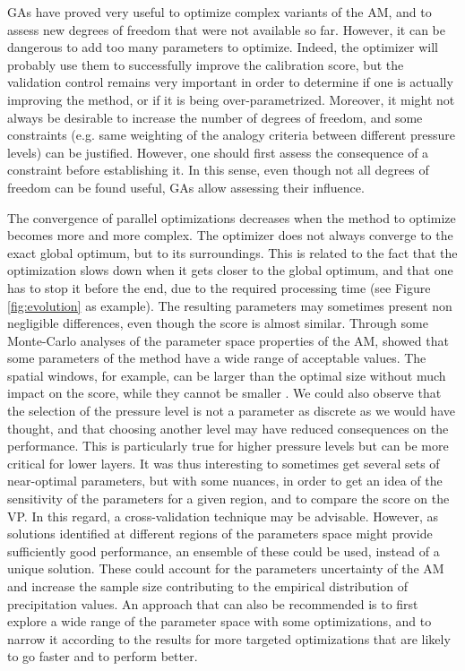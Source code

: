 \documentclass[review]{elsarticle}
\begin{document}
GAs have proved very useful to optimize complex variants of the AM, and to assess new degrees of freedom that were not available so far. However, it can be dangerous to add too many parameters to optimize. Indeed, the optimizer will probably use them to successfully improve the calibration score, but the validation control remains very important in order to determine if one is actually improving the method, or if it is being over-parametrized. Moreover, it might not always be desirable to increase the number of degrees of freedom, and some constraints (e.g. same weighting of the analogy criteria between different pressure levels) can be justified. However, one should first assess the consequence of a constraint before establishing it. In this sense, even though not all degrees of freedom can be found useful, GAs allow assessing their influence.

The convergence of parallel optimizations decreases when the method to optimize becomes more and more complex. The optimizer does not always converge to the exact global optimum, but to its surroundings. This is related to the fact that the optimization slows down when it gets closer to the global optimum, and that one has to stop it before the end, due to the required processing time (see Figure \ref{fig:evolution} as example). The resulting parameters may sometimes present non negligible differences, even though the score is almost similar. Through some Monte-Carlo analyses of the parameter space properties of the AM, \citet{Horton2012a} showed that some parameters of the method have a wide range of acceptable values. The spatial windows, for example, can be larger than the optimal size without much impact on the score, while they cannot be smaller \citep[see also][]{Bontron2004}. We could also observe that the selection of the pressure level is not a parameter as discrete as we would have thought, and that choosing another level may have reduced consequences on the performance. This is particularly true for higher pressure levels but can be more critical for lower layers. It was thus interesting to sometimes get several sets of near-optimal parameters, but with some nuances, in order to get an idea of the sensitivity of the parameters for a given region, and to compare the score on the VP. In this regard, a cross-validation technique may be advisable. However, as solutions identified at different regions of the parameters space might provide sufficiently good performance, an ensemble of these could be used, instead of a unique solution. These could account for the parameters uncertainty of the AM and increase the sample size contributing to the empirical distribution of precipitation values. An approach that can also be recommended is to first explore a wide range of the parameter space with some optimizations, and to narrow it according to the results for more targeted optimizations that are likely to go faster and to perform better.
\end{document}
